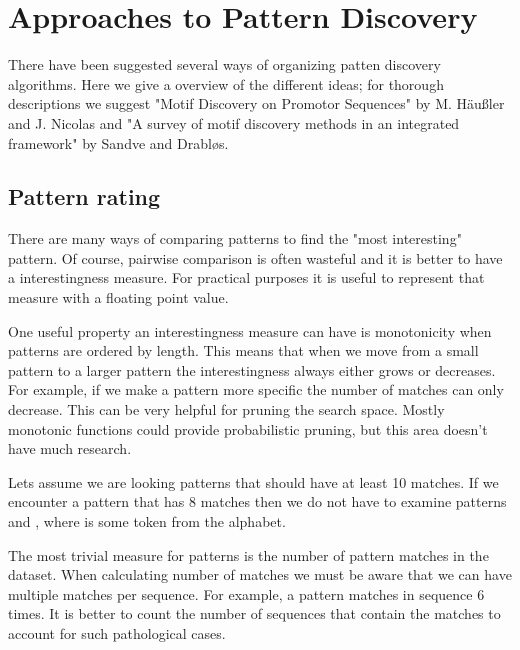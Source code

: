 \chapter{Approaches to Pattern Discovery}
\label{c:algorithms}

There have been suggested several ways of organizing patten discovery algorithms\cite{SurveyDNAMotif, SurveyMotifDiscovery, CombinatorialSubtle, Hausler05}. Here we give a overview of the different ideas; for thorough descriptions we suggest "Motif Discovery on Promotor Sequences" by M. Häußler and J. Nicolas\cite{Hausler05} and "A survey of motif discovery methods in an integrated framework" by Sandve and Drabløs\cite{SurveyMotifDiscovery}.

\section{Pattern rating}

There are many ways of comparing patterns to find the "most interesting" pattern. Of course, pairwise comparison is often wasteful and it is better to have a interestingness measure. For practical purposes it is useful to represent that measure with a floating point value.

One useful property an interestingness measure can have is monotonicity when patterns are ordered by length. This means that when we move from a small pattern to a larger pattern the interestingness always either grows or decreases. For example, if we make a pattern more specific the number of matches can only decrease. This can be very helpful for pruning the search space. Mostly monotonic functions could provide probabilistic pruning, but this area doesn't have much research.

\begin{exmp}
Lets assume we are looking patterns that should have at least 10 matches. If we encounter a pattern  that has 8 matches then we do not have to examine patterns  and , where  is some token from the alphabet.
\end{exmp}

The most trivial measure for patterns is the number of pattern matches in the dataset. When calculating number of matches we must be aware that we can have multiple matches per sequence. For example, a pattern  matches in sequence  6 times. It is better to count the number of sequences that contain the matches to account for such pathological cases.

